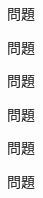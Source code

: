 \documentclass[uplatex,b5paper]{jsarticle}
\begin{document}
\maketitle

\begin{prob}{10}
  問題
\end{prob}
\begin{prob}{10}
  問題
\end{prob}
\begin{prob}{10}
  問題
\end{prob}
\begin{prob}{10}
  問題
\end{prob}
\begin{prob}{10}
  問題
\end{prob}
\begin{prob}{10}
  問題
\end{prob}
\probends
\end{document}

